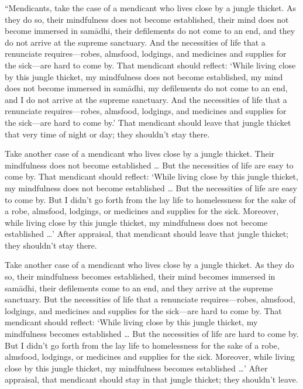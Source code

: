 \documentclass[12pt,openany]{book}%
\begin{document}
“Mendicants, take the case of a mendicant who lives close by a jungle thicket. As they do so, their mindfulness does not become established, their mind does not become immersed in \textsanskrit{samādhi}, their defilements do not come to an end, and they do not arrive at the supreme sanctuary. And the necessities of life that a renunciate requires—robes, almsfood, lodgings, and medicines and supplies for the sick—are hard to come by. That mendicant should reflect: ‘While living close by this jungle thicket, my mindfulness does not become established, my mind does not become immersed in \textsanskrit{samādhi}, my defilements do not come to an end, and I do not arrive at the supreme sanctuary. And the necessities of life that a renunciate requires—robes, almsfood, lodgings, and medicines and supplies for the sick—are hard to come by.’ That mendicant should leave that jungle thicket that very time of night or day; they shouldn’t stay there. 

Take another case of a mendicant who lives close by a jungle thicket. Their mindfulness does not become established … But the necessities of life are easy to come by. That mendicant should reflect: ‘While living close by this jungle thicket, my mindfulness does not become established … But the necessities of life are easy to come by. But I didn’t go forth from the lay life to homelessness for the sake of a robe, almsfood, lodgings, or medicines and supplies for the sick. Moreover, while living close by this jungle thicket, my mindfulness does not become established …’ After appraisal, that mendicant should leave that jungle thicket; they shouldn’t stay there. 

Take another case of a mendicant who lives close by a jungle thicket. As they do so, their mindfulness becomes established, their mind becomes immersed in \textsanskrit{samādhi}, their defilements come to an end, and they arrive at the supreme sanctuary. But the necessities of life that a renunciate requires—robes, almsfood, lodgings, and medicines and supplies for the sick—are hard to come by. That mendicant should reflect: ‘While living close by this jungle thicket, my mindfulness becomes established … But the necessities of life are hard to come by. But I didn’t go forth from the lay life to homelessness for the sake of a robe, almsfood, lodgings, or medicines and supplies for the sick. Moreover, while living close by this jungle thicket, my mindfulness becomes established …’ After appraisal, that mendicant should stay in that jungle thicket; they shouldn’t leave. 
\end{document}
